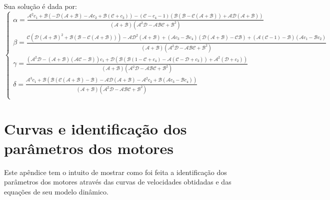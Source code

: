 \documentclass[]{politex}
\begin{document}
Sua solução é dada por:
\begin{equation}
\begin{cases}
\alpha = \frac{\mathcal{A}^2 c_1+\mathcal{B} \left(-\mathcal{D} (\mathcal{A}+\mathcal{B})-\mathcal{A} c_2+ \mathcal{B} (\mathcal{C}+ c_3) \right)-\left(\mathcal{C} -c_4 - 1 \right) (\mathcal{B} (\mathcal{B}-\mathcal{C} (\mathcal{A}+\mathcal{B}))+\mathcal{A} \mathcal{D} (\mathcal{A}+\mathcal{B}))}{(\mathcal{A}+\mathcal{B}) \left(\mathcal{A}^2 \mathcal{D}-\mathcal{A} \mathcal{B} \mathcal{C}+\mathcal{B}^2\right)} \\
\beta = \frac{\mathcal{C} \left( \mathcal{D} (\mathcal{A}+\mathcal{B})^2+ \mathcal{B} (\mathcal{B}-\mathcal{C} (\mathcal{A}+\mathcal{B})) \right)-\mathcal{A} \mathcal{D}^2 (\mathcal{A}+\mathcal{B})+\left(\mathcal{A} c_3- \mathcal{B} c_4 \right) (\mathcal{D} (\mathcal{A}+\mathcal{B})-\mathcal{C} \mathcal{B})+ (\mathcal{A} (\mathcal{C}-1)-\mathcal{B})(\mathcal{A} c_1 - \mathcal{B} c_2)}{(\mathcal{A}+\mathcal{B}) \left(\mathcal{A}^2 \mathcal{D}-\mathcal{A} \mathcal{B} \mathcal{C}+\mathcal{B}^2\right)} \\
\gamma = \frac{ \left(\mathcal{A}^2 \mathcal{D}-(\mathcal{A}+\mathcal{B}) (\mathcal{A} \mathcal{C}-\mathcal{B})\right)c_1 +\mathcal{D} \left(\mathcal{B} \left( \mathcal{B} (1-\mathcal{C} + c_4) - \mathcal{A} (\mathcal{C} - \mathcal{D} + c_3) \right)+\mathcal{A}^2( \mathcal{D}+ c_2) \right)}{(\mathcal{A}+\mathcal{B}) \left(\mathcal{A}^2 \mathcal{D}-\mathcal{A} \mathcal{B} \mathcal{C}+\mathcal{B}^2\right)} \\
\delta = \frac{\mathcal{A}^3 c_1+\mathcal{B} \left(\mathcal{B} (\mathcal{C} (\mathcal{A}+\mathcal{B})-\mathcal{B})-\mathcal{A} \mathcal{D} (\mathcal{A}+\mathcal{B})-\mathcal{A}^2 c_2 +\mathcal{B} \left(\mathcal{A} c_3- \mathcal{B} c_4 \right)\right)}{(\mathcal{A}+\mathcal{B}) \left(\mathcal{A}^2 \mathcal{D}-\mathcal{A} \mathcal{B} \mathcal{C}+\mathcal{B}^2\right)} \\
\end{cases}
\end{equation}



\chapter{Curvas e identificação dos parâmetros dos motores} \label{ap:CurvaDosMotores}

Este apêndice tem o intuito de mostrar como foi feita a identificação dos parâmetros dos motores através das curvas de velocidades obtidadas e das equações de seu modelo dinâmico. 
\end{document}
